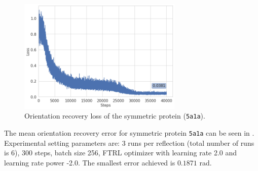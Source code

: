 \begin{figure}[ht!]
    \centering
    \includegraphics[height=5.5cm]{images/5a1a_noise0_angle_recovery.png}
    \caption{ Orientation recovery loss of the symmetric protein (\texttt{5a1a}).}
    \label{fig:5a1a-orientation-recovery-loss}
\end{figure}

The mean orientation recovery error for symmetric protein \texttt{5a1a} can be seen in . Experimental setting parameters are: 3 runs per reflection (total number of runs is 6), 300 steps, batch size 256, FTRL optimizer with learning rate 2.0 and learning rate power -2.0. The smallest error achieved is $0.1871$ rad.

